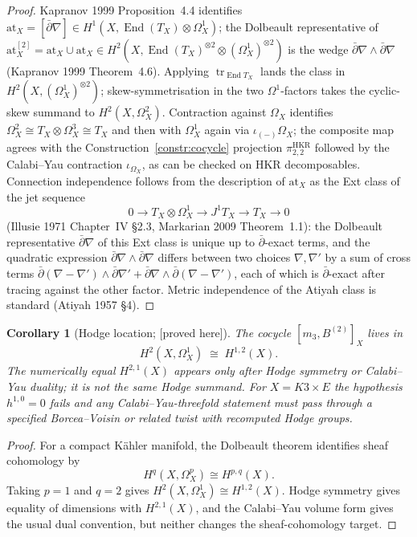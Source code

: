 \documentclass[11pt,reqno]{amsart}
\theoremstyle{plain}
\newtheorem{corollary}[theorem]{Corollary}
\theoremstyle{definition}
\theoremstyle{remark}
\providecommand{\ClaimStatusProvedHere}{\textnormal{[proved here]}}
\DeclareMathOperator{\End}{End}
\DeclareMathOperator{\tr}{tr}
\newcommand{\at}{\mathrm{at}}
\begin{document}
\begin{proof}
Kapranov 1999 Proposition~4.4 identifies
$\at_X=[\bar\partial\nabla]\in H^1(X,\End(T_X)\otimes\Omega^1_X)$;
the Dolbeault representative of
$\at_X^{[2]}=\at_X\cup\at_X\in
H^2(X,\End(T_X)^{\otimes 2}\otimes(\Omega^1_X)^{\otimes 2})$
is the wedge $\bar\partial\nabla\wedge\bar\partial\nabla$ (Kapranov
1999 Theorem~4.6). Applying $\tr_{\End T_X}$ lands the class in
$H^2(X,(\Omega^1_X)^{\otimes 2})$; skew-symmetrisation in the two
$\Omega^1$-factors takes the cyclic-skew summand to
$H^2(X,\Omega^2_X)$. Contraction against $\Omega_X$ identifies
$\Omega^2_X\cong T_X\otimes\Omega^3_X\cong T_X$ and then with
$\Omega^1_X$ again via $\iota_{(-)}\Omega_X$; the composite map agrees
with the Construction~\ref{constr:cocycle} projection
$\pi^{\mathrm{HKR}}_{2,2}$ followed by the Calabi--Yau contraction
$\iota_{\Omega_X}$, as can be checked on HKR decomposables. Connection
independence follows from the description of $\at_X$ as the Ext class
of the jet sequence
\[
  0\to T_X\otimes\Omega^1_X\to J^1T_X\to T_X\to 0
\]
(Illusie 1971 Chapter~IV \S2.3, Markarian 2009 Theorem~1.1): the
Dolbeault representative $\bar\partial\nabla$ of this Ext class is
unique up to $\bar\partial$-exact terms, and the quadratic expression
$\bar\partial\nabla\wedge\bar\partial\nabla$ differs between two
choices $\nabla,\nabla'$ by a sum of cross terms
$\bar\partial(\nabla-\nabla')\wedge\bar\partial\nabla'
+\bar\partial\nabla\wedge\bar\partial(\nabla-\nabla')$, each of
which is $\bar\partial$-exact after tracing against the other factor.
Metric independence of the Atiyah class is standard (Atiyah 1957 \S4).
\end{proof}

\begin{corollary}[Hodge location; \ClaimStatusProvedHere]
\label{cor:hodge}
The cocycle $[m_3, B^{(2)}]_X$ lives in
\[
  H^2(X, \Omega^1_X) \;\cong\; H^{1,2}(X).
\]
The numerically equal $H^{2,1}(X)$ appears only after Hodge symmetry or Calabi--Yau duality; it is not the same Hodge summand. For $X = K3 \times E$ the hypothesis $h^{1,0}=0$ fails and any Calabi--Yau-threefold statement must pass through a specified Borcea--Voisin or related twist with recomputed Hodge groups.
\end{corollary}

\begin{proof}
For a compact Kähler manifold, the Dolbeault theorem identifies sheaf cohomology by
\[
  H^q(X,\Omega^p_X)\cong H^{p,q}(X).
\]
Taking $p=1$ and $q=2$ gives $H^2(X,\Omega^1_X)\cong H^{1,2}(X)$. Hodge symmetry gives equality of dimensions with $H^{2,1}(X)$, and the Calabi--Yau volume form gives the usual dual convention, but neither changes the sheaf-cohomology target.
\end{proof}
\end{document}
